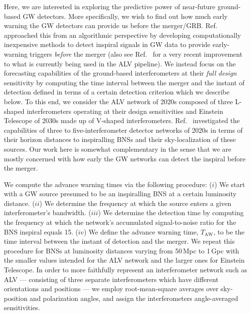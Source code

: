 \documentclass[prd,amsmath,amssymb,aps,floats,amsfonts,notitlepage,superscriptaddress,eqsecnum,nofootinbib,10pt]{revtex4-1}
\begin{document}
Here, we are interested  in exploring the predictive power of near-future ground-based GW detectors. 
More specifically, we wish to find out how much early warning the GW detectors can provide us before the merger/GRB.
Ref.~\cite{Cannon:2011vi} approached this from an algorithmic perspective by developing computationally inexpensive methods to detect inspiral
signals in GW data to provide early-warning triggers \emph{before} the merger (also see Ref.~\cite{Knowles:2018hqq} for a very recent improvement to what is currently being
used in the ALV pipeline).
We instead focus on the forecasting capabilities of the ground-based interferometers at their \emph{full design} sensitivity by computing the time interval
between the merger and the instant of detection defined in terms of a certain detection criterion which we describe below.
To this end, we consider the ALV network of 2020s composed of three L-shaped interferometers operating at their design sensitivities
and Einstein Telescope of 2030s made up of V-shaped interferometers.
Ref.~\cite{Nissanke:2012dj} investigated the capabilities of three to five-interferometer detector networks of 2020s in terms of their horizon distances
to inspiralling BNSs and their sky-localization of these sources. Our work here is somewhat complementary in the sense that we are mostly concerned with
how early the GW networks can detect the inspiral before the merger.

We compute the advance warning times via the following procedure: 
(${i}$) We start with a GW source presumed to be an inspiralling BNS at a certain luminosity distance. %
(${ii}$) We determine the frequency at which the source enters a given interferometer's bandwidth. 
(${iii}$) We determine the detection time by computing the frequency at which the network's accumulated signal-to-noise ratio for the BNS inspiral equals 15.
($iv$) We define the advance warning time, $T_\text{AW}$, to be the time interval between the instant of detection and the merger.
We repeat this procedure for BNSs at luminosity distances varying from 50\,Mpc to 1\,Gpc with the smaller values intended for the ALV network and 
the larger ones for Einstein Telescope.
In order to more faithfully represent an interferometer network such as ALV --- consisting of three separate interferometers which have different
orientations and positions --- we employ root-mean-square averages over sky-position and polarization angles,
and assign the interferometers angle-averaged sensitivities.
\end{document}
